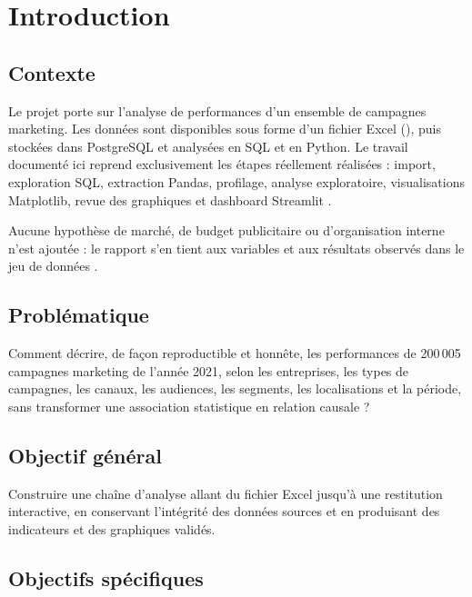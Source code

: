 \chapter{Introduction}
\label{chap:introduction}

\section{Contexte}
\label{sec:contexte}

Le projet porte sur l'analyse de performances d'un ensemble de campagnes marketing. Les données sont disponibles sous forme d'un fichier Excel (), puis stockées dans PostgreSQL et analysées en SQL et en Python. Le travail documenté ici reprend exclusivement les étapes réellement réalisées : import, exploration SQL, extraction Pandas, profilage, analyse exploratoire, visualisations Matplotlib, revue des graphiques et dashboard Streamlit \cite{pandasdocs,matplotlibdocs,streamlitdocs,postgresql18}.

Aucune hypothèse de marché, de budget publicitaire ou d'organisation interne n'est ajoutée : le rapport s'en tient aux variables et aux résultats observés dans le jeu de données \cite{marketingdataset}.

\section{Problématique}

Comment décrire, de façon reproductible et honnête, les performances de 200\,005 campagnes marketing de l'année 2021, selon les entreprises, les types de campagnes, les canaux, les audiences, les segments, les localisations et la période, sans transformer une association statistique en relation causale ?

\section{Objectif général}

Construire une chaîne d'analyse allant du fichier Excel jusqu'à une restitution interactive, en conservant l'intégrité des données sources et en produisant des indicateurs et des graphiques validés.

\section{Objectifs spécifiques}


